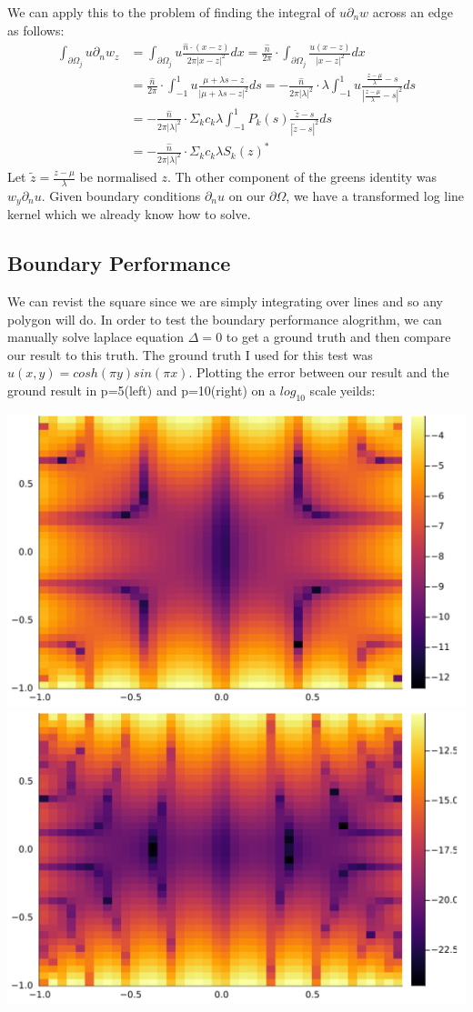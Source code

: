 \documentclass{article}
\begin{document}
We can apply this to the problem of finding the integral of $u\partial_nw$ across an edge as follows:
\begin{align}
    \int_{\partial\Omega_j}u\partial_nw_z&=\int_{\partial\Omega_j}u\frac{\hat n\cdot(x-z)}{2\pi|x-z|^2}dx
    =\frac{\hat n}{2\pi}\cdot\int_{\partial\Omega_j}\frac{u(x-z)}{|x-z|^2}dx\\
    &=\frac{\hat n}{2\pi}\cdot\int_{-1}^1u\frac{\mu+\lambda s-z}{|\mu+\lambda s-z|^2}ds
    =-\frac{\hat n}{2\pi|\lambda|^2}\cdot\lambda\int_{-1}^1u\frac{\frac{z-\mu}{\lambda}- s}{|\frac{z-\mu}{\lambda}-s|^2}ds\\
    &=-\frac{\hat n}{2\pi|\lambda|^2}\cdot\Sigma_kc_k\lambda\int_{-1}^1P_k(s)\frac{\tilde z- s}{|\tilde z-s|^2}ds\\
    &=-\frac{\hat n}{2\pi|\lambda|^2}\cdot\Sigma_kc_k\lambda S_k(z)^*
\end{align}
Let $\tilde z = \frac{z-\mu}{\lambda}$ be normalised $z$.
Th other component of the greens identity was $w_y\partial_nu$.
Given boundary conditions $\partial_nu$ on our $\partial\Omega$, we have a transformed log line kernel which we already know how to solve.
\subsection{Boundary Performance}
We can revist the square since we are simply integrating over lines and so any polygon will do.
In order to test the boundary performance alogrithm, we can manually solve laplace equation $\Delta=0$ to get a ground truth and then compare our result to this truth.
The ground truth I used for this test was $u(x,y) = cosh(\pi y)sin(\pi x)$.
Plotting the error between our result and the ground result in p=5(left) and p=10(right) on a $log_{10}$ scale yeilds:

\includegraphics[width=.5\textwidth]{bemp10}
\includegraphics[width=.5\textwidth]{bemp5}
\end{document}
